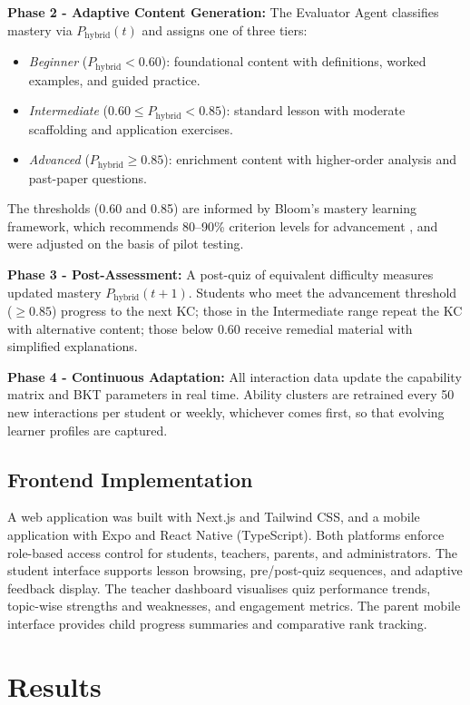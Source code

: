 \documentclass[conference]{IEEEtran}
\begin{document}
\textbf{Phase 2 - Adaptive Content Generation:} The Evaluator Agent classifies mastery via $P_{\text{hybrid}}(t)$ and assigns one of three tiers:
\begin{itemize}
\item \textit{Beginner} ($P_{\text{hybrid}} < 0.60$): foundational content with definitions, worked examples, and guided practice.
\item \textit{Intermediate} ($0.60 \leq P_{\text{hybrid}} < 0.85$): standard lesson with moderate scaffolding and application exercises.
\item \textit{Advanced} ($P_{\text{hybrid}} \geq 0.85$): enrichment content with higher-order analysis and past-paper questions.
\end{itemize}

The thresholds (0.60 and 0.85) are informed by Bloom's mastery learning framework, which recommends 80--90\% criterion levels for advancement \cite{b35}, and were adjusted on the basis of pilot testing.

\textbf{Phase 3 - Post-Assessment:} A post-quiz of equivalent difficulty measures updated mastery $P_{\text{hybrid}}(t+1)$. Students who meet the advancement threshold ($\geq 0.85$) progress to the next KC; those in the Intermediate range repeat the KC with alternative content; those below 0.60 receive remedial material with simplified explanations.

\textbf{Phase 4 - Continuous Adaptation:} All interaction data update the capability matrix and BKT parameters in real time. Ability clusters are retrained every 50 new interactions per student or weekly, whichever comes first, so that evolving learner profiles are captured.

\subsection{Frontend Implementation}

A web application was built with Next.js and Tailwind CSS, and a mobile application with Expo and React Native (TypeScript). Both platforms enforce role-based access control for students, teachers, parents, and administrators. The student interface supports lesson browsing, pre/post-quiz sequences, and adaptive feedback display. The teacher dashboard visualises quiz performance trends, topic-wise strengths and weaknesses, and engagement metrics. The parent mobile interface provides child progress summaries and comparative rank tracking.

\section{Results}
\end{document}

